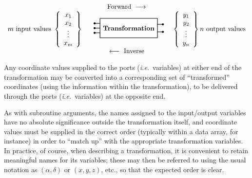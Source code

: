 \documentclass[twoside,11pt]{article}
\begin{document}
\begin{displaymath}
\begin{array}{c}
\mbox{Forward } \longrightarrow \\

m \mbox{ input values }
\left\{ \begin{array}{c} x_1 \\ x_2 \\ \vdots \\ x_m \end{array} \right\}

\begin{array}{c}\mbox{
\setlength{\unitlength}{1mm}
\thicklines
\begin{picture}(40, 10)(-20,-5)
\put(-15,-5){\framebox(30,10){\textbf{Transformation}}}
\multiput(-15,-2.5)(0,2.5){3}{\line(-1,0){3}}
\multiput(-18,-2.5)(0,2.5){3}{\circle*{1}}
\multiput(15,-2)(0,4){2}{\line(1,0){3}}
\multiput(18,-2)(0,4){2}{\circle*{1}}
\end{picture}
} \end{array}

\left\{ \begin{array}{c} y_1 \\ y_2 \\ \vdots \\ y_n \end{array} \right\}
n \mbox{ output values}

\\ \longleftarrow \mbox{ Inverse}
\end{array}
\end{displaymath}

Any coordinate values supplied to the ports (\emph{i.e.}\ variables) at
either end of the transformation may be converted into a corresponding set
of ``transformed'' coordinates (using the information within the
transformation), to be delivered through the ports (\emph{i.e.}\ variables)
at the opposite end. 

As with subroutine arguments, the names assigned to the input/output
variables have no absolute significance outside the transformation itself,
and coordinate values must be supplied in the correct order (typically
within a data array, for instance) in order to ``match up'' with the
appropriate transformation variables. 
In practice, of course, when describing a transformation, it is convenient
to retain meaningful names for its variables; these may then be referred to
using the usual notation as \mbox{$(\alpha,\delta)$} or \mbox{$(x,y,z)$}, 
etc., so that the expected order is clear. 
\end{document}
